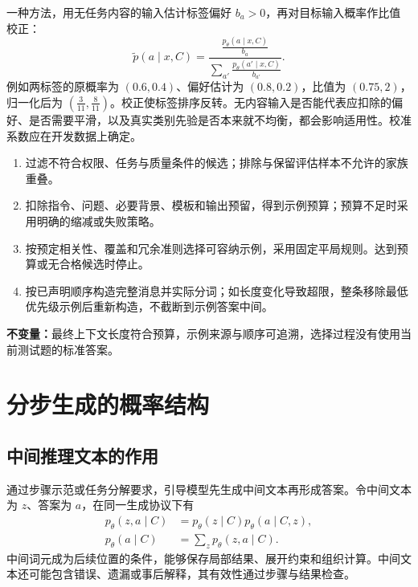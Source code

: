 \documentclass[../textbook.tex]{subfiles}
\begin{document}
一种方法，用无任务内容的输入估计标签偏好 $b_a>0$，再对目标输入概率作比值校正\cite{zhao2021contextcalibration}：
\begin{equation}
\widetilde p(a\mid x,C)=\frac{\frac{p_\theta(a\mid x,C)}{b_a}}{\sum_{a'}\frac{p_\theta(a'\mid x,C)}{b_{a'}}}.
\end{equation}
例如两标签的原概率为 $(0.6,0.4)$、偏好估计为 $(0.8,0.2)$，比值为 $(0.75,2)$，归一化后为 $(\frac{3}{11},\frac{8}{11})$。校正使标签排序反转。无内容输入是否能代表应扣除的偏好、是否需要平滑，以及真实类别先验是否本来就不均衡，都会影响适用性。校准系数应在开发数据上确定。

\begin{algorithm}[预算内的示例构造]
\begin{enumerate}
\item 过滤不符合权限、任务与质量条件的候选；排除与保留评估样本不允许的家族重叠。
\item 扣除指令、问题、必要背景、模板和输出预留，得到示例预算；预算不足时采用明确的缩减或失败策略。
\item 按预定相关性、覆盖和冗余准则选择可容纳示例，采用固定平局规则。达到预算或无合格候选时停止。
\item 按已声明顺序构造完整消息并实际分词；如长度变化导致超限，整条移除最低优先级示例后重新构造，不截断到示例答案中间。
\end{enumerate}
\textbf{不变量：}最终上下文长度符合预算，示例来源与顺序可追溯，选择过程没有使用当前测试题的标准答案。
\end{algorithm}

\section{分步生成的概率结构}

\subsection{中间推理文本的作用}
通过步骤示范或任务分解要求，引导模型先生成中间文本再形成答案\cite{wei2022cot}。令中间文本为 $z$、答案为 $a$，在同一生成协议下有
\begin{equation}\label{eq:icl-marginal}
 \begin{aligned}
  p_\theta(z,a\mid C) &= p_\theta(z\mid C)p_\theta(a\mid C,z), \\
  p_\theta(a\mid C) &= \sum_z p_\theta(z,a\mid C).
 \end{aligned}
\end{equation}
中间词元成为后续位置的条件，能够保存局部结果、展开约束和组织计算。中间文本还可能包含错误、遗漏或事后解释，其有效性通过步骤与结果检查。
\end{document}
